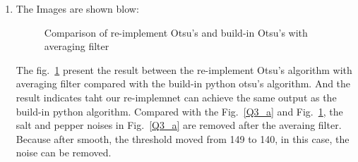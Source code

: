 \documentclass[12pt]{article}
\begin{document}
\begin{enumerate}[1]
\begin{enumerate}
\item The Images are shown blow:
    \begin{figure}[H]
        \centering
        \quad
        \caption{Comparison of re-implement Otsu's and build-in Otsu's with averaging filter}
        \label{Q3_b}
    \end{figure}

The fig.~\ref{Q3_b} present the result between the re-implement Otsu's algorithm with averaging filter compared with the build-in python otsu's algorithm.
And the result indicates taht our re-implemnet can achieve the same output as the build-in python algorithm.
Compared with the Fig.~\ref{Q3_a} and Fig.~\ref{Q3_b}, the salt and pepper noises in Fig.~\ref{Q3_a} are removed after the averaing filter.
Because after smooth, the threshold moved from 149 to 140, in this case, the noise can be removed.

\end{enumerate}



\end{enumerate}
\end{document}
